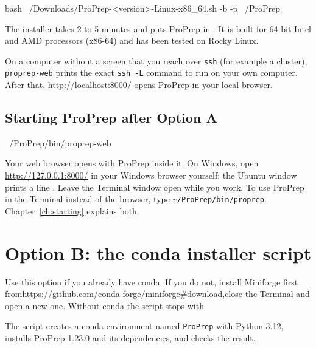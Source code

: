 \begin{terminal}
bash ~/Downloads/ProPrep-<version>-Linux-x86_64.sh -b -p ~/ProPrep
\end{terminal}

The installer takes 2 to 5 minutes and puts ProPrep in . It is
built for 64-bit Intel and AMD processors (x86-64) and has been tested on Rocky
Linux.

\begin{tip}
On a computer without a screen that you reach over \texttt{ssh} (for example a
cluster), \texttt{proprep-web} prints the exact \texttt{ssh -L} command to run
on your own computer. After that, \url{http://localhost:8000/} opens ProPrep in
your local browser.
\end{tip}

\subsection{Starting ProPrep after Option A}

\begin{terminal}
~/ProPrep/bin/proprep-web
\end{terminal}

Your web browser opens with ProPrep inside it. On Windows, open
\url{http://127.0.0.1:8000/} in your Windows browser yourself; the Ubuntu
window prints a line . Leave the Terminal window open while you work. To use
ProPrep in the Terminal instead of the browser, type
\texttt{\textasciitilde/ProPrep/bin/proprep}. Chapter~\ref{ch:starting}
explains both.

\section{Option B: the conda installer script}
\label{sec:installation-optionb}

Use this option if you already have conda. If you do not, install Miniforge
first from\newline \url{https://github.com/conda-forge/miniforge#download},\newline close the
Terminal and open a new one. Without conda the script stops with

The script creates a conda environment named \texttt{ProPrep} with Python 3.12,
installs ProPrep 1.23.0 and its dependencies, and checks the result.

